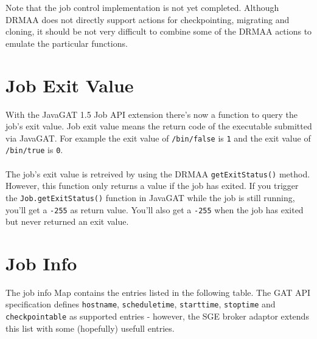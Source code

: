 \documentclass[bibtotocnumbered, headsepline,normalheadings]{scrreprt}
\begin{document}
Note that the job control implementation is not yet completed. Although DRMAA does not directly support actions for checkpointing,
migrating and cloning, it should be not very difficult to combine some of the DRMAA actions to emulate the particular functions. 

\section{Job Exit Value}
With the JavaGAT 1.5 Job API extension there's now a function to query the job's exit value. Job exit value means the return code of the executable submitted via JavaGAT. For example the exit value of \texttt{/bin/false} is \texttt{1} and the exit value of \texttt{/bin/true} is \texttt{0}.\\ \\
The job's exit value is retreived by using the DRMAA \texttt{getExitStatus()} method. However, this function only returns a value if the job has exited. If you trigger the \texttt{Job.getExitStatus()} function in JavaGAT while the job is still running, you'll get a \texttt{-255} as return value. You'll also get a \texttt{-255} when the job has exited but never returned an exit value.

\section{Job Info}
The job info Map contains the entries listed in the following table. The GAT API specification defines \texttt{hostname}, \texttt{scheduletime}, \texttt{starttime}, \texttt{stoptime} and \texttt{checkpointable} as supported entries - however, the SGE broker adaptor extends this list with some (hopefully) usefull entries.
\end{document}
